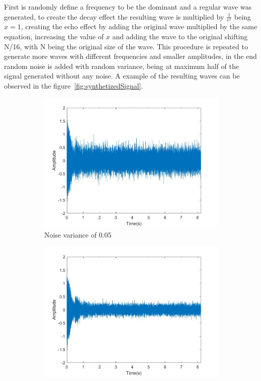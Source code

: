 First is randomly define a frequency to be the dominant and a regular wave was generated, to create the decay effect the resulting wave is multiplied by $\frac{1}{e^{x}}$ being $x=1$, creating the echo effect by adding the original wave multiplied by the same equation, increasing the value of $x$ and adding the wave to the original shifting N/16, with N being the original size of the wave. This procedure is repeated to generate more waves with different frequencies and smaller amplitudes, in the end random noise is added with random variance, being at maximum half of the signal generated without any noise. A example of the resulting waves can be observed in the figure~\ref{fig:synthetizedSignal}.
\begin{figure}[]
    \centering
    \begin{subfigure}{0.45\textwidth}
        \centering
        \includegraphics[width=\linewidth]{Chapters/6CHP/Figures/signal1.jpg}
        \caption{Noise variance of 0.05}{}
    \end{subfigure}
    \begin{subfigure}{0.45\textwidth}
        \centering
        \includegraphics[width=\linewidth]{Chapters/6CHP/Figures/signal2.jpg}

\end{subfigure}
\end{figure}
